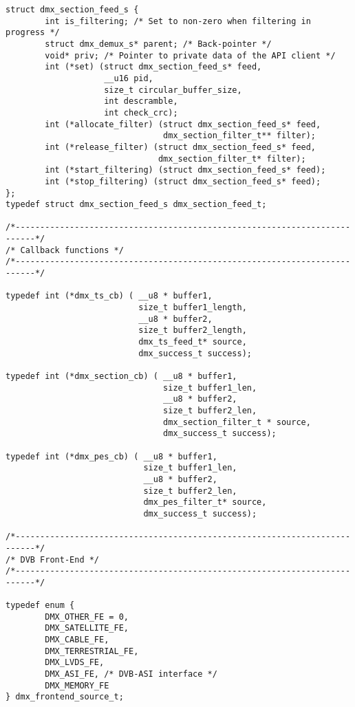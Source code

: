 \begin{verbatim}
struct dmx_section_feed_s { 
        int is_filtering; /* Set to non-zero when filtering in progress */ 
        struct dmx_demux_s* parent; /* Back-pointer */
        void* priv; /* Pointer to private data of the API client */ 
        int (*set) (struct dmx_section_feed_s* feed, 
                    __u16 pid, 
                    size_t circular_buffer_size, 
                    int descramble, 
                    int check_crc); 
        int (*allocate_filter) (struct dmx_section_feed_s* feed, 
                                dmx_section_filter_t** filter); 
        int (*release_filter) (struct dmx_section_feed_s* feed, 
                               dmx_section_filter_t* filter); 
        int (*start_filtering) (struct dmx_section_feed_s* feed); 
        int (*stop_filtering) (struct dmx_section_feed_s* feed); 
};
typedef struct dmx_section_feed_s dmx_section_feed_t; 

/*--------------------------------------------------------------------------*/ 
/* Callback functions */ 
/*--------------------------------------------------------------------------*/ 

typedef int (*dmx_ts_cb) ( __u8 * buffer1, 
                           size_t buffer1_length,
                           __u8 * buffer2, 
                           size_t buffer2_length,
                           dmx_ts_feed_t* source, 
                           dmx_success_t success); 

typedef int (*dmx_section_cb) ( __u8 * buffer1,
                                size_t buffer1_len,
                                __u8 * buffer2, 
                                size_t buffer2_len,
                                dmx_section_filter_t * source,
                                dmx_success_t success);

typedef int (*dmx_pes_cb) ( __u8 * buffer1, 
                            size_t buffer1_len,
                            __u8 * buffer2,
                            size_t buffer2_len,
                            dmx_pes_filter_t* source, 
                            dmx_success_t success); 

/*--------------------------------------------------------------------------*/ 
/* DVB Front-End */
/*--------------------------------------------------------------------------*/ 

typedef enum { 
        DMX_OTHER_FE = 0, 
        DMX_SATELLITE_FE, 
        DMX_CABLE_FE, 
        DMX_TERRESTRIAL_FE, 
        DMX_LVDS_FE, 
        DMX_ASI_FE, /* DVB-ASI interface */
        DMX_MEMORY_FE
} dmx_frontend_source_t; 


\end{verbatim}

